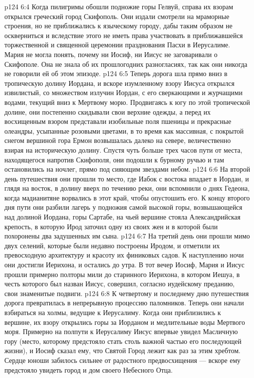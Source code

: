 \vs p124 6:4 Когда пилигримы обошли подножие горы Гелвуй, справа их взорам открылся греческий город Скифополь. Они издали смотрели на мраморные строения, но не приближались к языческому городу, дабы таким образом не оскверниться и вследствие этого не иметь права участвовать в приближавшейся торжественной и священной церемонии празднования Пасхи в Иерусалиме. Мария не могла понять, почему ни Иосиф, ни Иисус не заговаривали о Скифополе. Она не знала об их прошлогодних разногласиях, так как они никогда не говорили ей об этом эпизоде.
\vs p124 6:5 Теперь дорога шла прямо вниз в тропическую долину Иордана, и вскоре изумленному взору Иисуса открылся извилистый, со множеством излучин Иордан, с его сверкающими и журчащими водами, текущий вниз к Мертвому морю. Продвигаясь к югу по этой тропической долине, они постепенно скидывали свои верхние одежды, а перед их восхищенным взором представали изобильные поля пшеницы и прекрасные олеандры, усыпанные розовыми цветами, в то время как массивная, с покрытой снегом вершиной гора Ермон возвышалась далеко на севере, величественно взирая на историческую долину. Спустя чуть больше трех часов пути от места, находящегося напротив Скифополя, они подошли к бурному ручью и там остановились на ночлег, прямо под сияющим звездами небом.
\vs p124 6:6 \pc На второй день путешествия они прошли то место, где Иабок с востока впадает в Иордан, и глядя на восток, в долину вверх по течению реки, они вспомнили о днях Гедеона, когда мадианитяне ворвались в этот край, чтобы опустошить его. К концу второго дня пути они разбили лагерь у подножия самой высокой горы, возвышающейся над долиной Иордана, горы Сартабе, на чьей вершине стояла Александрийская крепость, в которую Ирод заточил одну из своих жен и в которой были похоронены два задушенных им сына.
\vs p124 6:7 На третий день они прошли мимо двух селений, которые были недавно построены Иродом, и отметили их превосходную архитектуру и красоту их финиковых садов. К наступлению ночи они достигли Иерихона, и остались до утра. В тот вечер Иосиф, Мария и Иисус прошли примерно полторы мили до старинного Иерихона, в котором Иешуа, в честь которого был назван Иисус, совершил, согласно иудейскому преданию, свои знаменитые подвиги.
\vs p124 6:8 К четвертому и последнему дню путешествия дорога превратилась в непрерывную процессию паломников. Теперь они начали взбираться на холмы, ведущие к Иерусалиму. Когда они приблизились к вершине, их взору открылись горы за Иорданом и медлительные воды Мертвого моря. Примерно на полпути к Иерусалиму Иисус впервые увидел Масличную гору (место, которому предстояло стать столь важной частью его последующей жизни), и Иосиф сказал ему, что Святой Город лежит как раз за этим хребтом. Сердце юноши забилось сильнее от радостного предвосхищения --- вскоре ему предстояло увидеть город и дом своего Небесного Отца.
